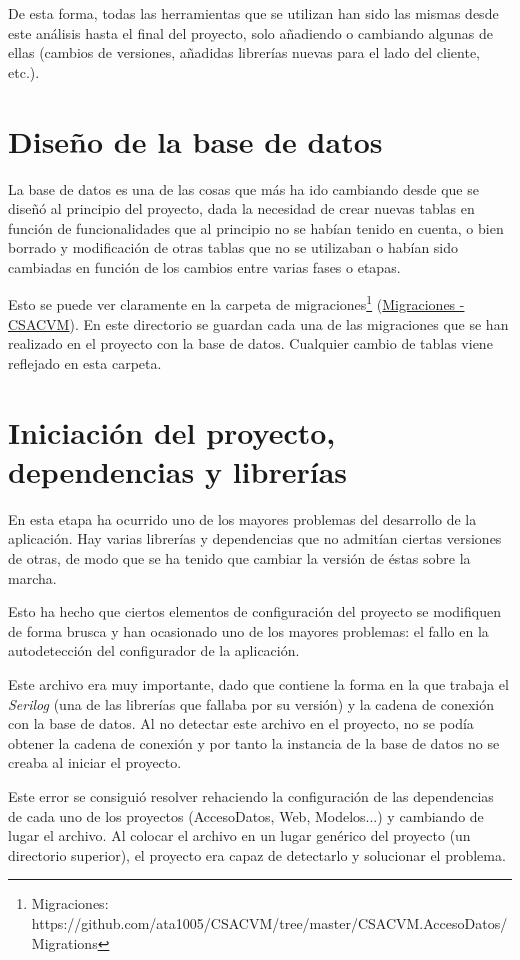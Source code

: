 De esta forma, todas las herramientas que se utilizan han sido las mismas desde este análisis hasta el final del proyecto, solo añadiendo o cambiando algunas de ellas (cambios de versiones, añadidas librerías nuevas para el lado del cliente, etc.).

\section{Diseño de la base de datos}
La base de datos es una de las cosas que más ha ido cambiando desde que se diseñó al principio del proyecto, dada la necesidad de crear nuevas tablas en función de funcionalidades que al principio no se habían tenido en cuenta, o bien borrado y modificación de otras tablas que no se utilizaban o habían sido cambiadas en función de los cambios entre varias fases o etapas.

Esto se puede ver claramente en la carpeta de migraciones\footnote{Migraciones: https://github.com/ata1005/CSACVM/tree/master/CSACVM.AccesoDatos/Migrations} (\href{https://github.com/ata1005/CSACVM/tree/master/CSACVM.AccesoDatos/Migrations}{Migraciones - CSACVM}). En este directorio se guardan cada una de las migraciones que se han realizado en el proyecto con la base de datos. Cualquier cambio de tablas viene reflejado en esta carpeta.

\section{Iniciación del proyecto, dependencias y librerías}
En esta etapa ha ocurrido uno de los mayores problemas del desarrollo de la aplicación. Hay varias librerías y dependencias que no admitían ciertas versiones de otras, de modo que se ha tenido que cambiar la versión de éstas sobre la marcha.

Esto ha hecho que ciertos elementos de configuración del proyecto se modifiquen de forma brusca y han ocasionado uno de los mayores problemas: el fallo en la autodetección del configurador de la aplicación.

Este archivo era muy importante, dado que contiene la forma en la que trabaja el \emph{Serilog} (una de las librerías que fallaba por su versión) y la cadena de conexión con la base de datos. Al no detectar este archivo en el proyecto, no se podía obtener la cadena de conexión y por tanto la instancia de la base de datos no se creaba al iniciar el proyecto.

Este error se consiguió resolver rehaciendo la configuración de las dependencias de cada uno de los proyectos (AccesoDatos, Web, Modelos...) y cambiando de lugar el archivo. Al colocar el archivo en un lugar genérico del proyecto (un directorio superior), el proyecto era capaz de detectarlo y solucionar el problema. 

